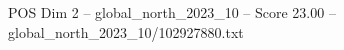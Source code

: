 \begin{textsample}{POS Dim 2 – global\_north\_2023\_10 – Score 23.00 – global\_north\_2023\_10/102927880.txt}
\end{textsample}
